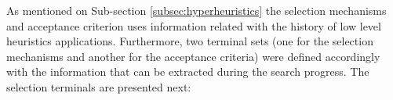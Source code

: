 \documentclass[conference]{IEEEtran}
\begin{document}






As mentioned on Sub-section \ref{subsec:hyperheuristics} the selection mechanisms and acceptance criterion uses information related with the history of low level heuristics applications. Furthermore, two terminal sets (one for the selection mechanisms and another for the acceptance criteria) were defined accordingly with the information that can be extracted during the search progress. The selection terminals are presented next:

\end{document}
